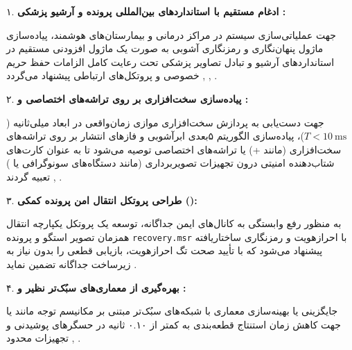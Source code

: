 


۱. \textbf{ادغام مستقیم با استانداردهای بین‌المللی پرونده و آرشیو پزشکی :}\par
جهت عملیاتی‌سازی سیستم در مراکز درمانی و بیمارستان‌های هوشمند، پیاده‌سازی ماژول پنهان‌نگاری  و رمزنگاری آشوبی به صورت یک ماژول افزودنی  مستقیم در استانداردهای آرشیو و تبادل تصاویر پزشکی  تحت رعایت کامل الزامات حفظ حریم خصوصی  و پروتکل‌های ارتباطی  پیشنهاد می‌گردد , , .\par

۲. \textbf{پیاده‌سازی سخت‌افزاری بر روی تراشه‌های اختصاصی  و :}\par
جهت دست‌یابی به پردازش سخت‌افزاری موازی زمان‌واقعی در ابعاد میلی‌ثانیه ($T < 10\mathrm{\ ms}$)، پیاده‌سازی الگوریتم ۵بعدی ابرآشوبی و فازهای انتشار  بر روی تراشه‌های سخت‌افزاری  (مانند +) یا تراشه‌های اختصاصی  توصیه می‌شود تا به عنوان کارت‌های شتاب‌دهنده امنیتی درون تجهیزات تصویربرداری (مانند دستگاه‌های سونوگرافی یا ) تعبیه گردند , .\par

۳. \textbf{طراحی پروتکل انتقال امن پرونده کمکی (\texorpdfstring{}{Sidecar Secure Transport Protocol}):}\par
به منظور رفع وابستگی به کانال‌های ایمن جداگانه، توسعه یک پروتکل یکپارچه انتقال همزمان تصویر استگو و پرونده \texttt{recovery.msr} با احرازهویت و رمزنگاری ساختاریافته  پیشنهاد می‌شود که با تأیید صحت تگ احرازهویت، بازیابی قطعی را بدون نیاز به زیرساخت  جداگانه تضمین نماید .\par

۴. \textbf{بهره‌گیری از معماری‌های سبُک‌تر نظیر   و :}\par
جایگزینی یا بهینه‌سازی معماری  با شبکه‌های سبُک‌تر مبتنی بر مکانیسم توجه  مانند  یا  جهت کاهش زمان استنتاج قطعه‌بندی  به کمتر از ۰.۱۰ ثانیه در حسگرهای پوشیدنی و تجهیزات محدود  , .\par



